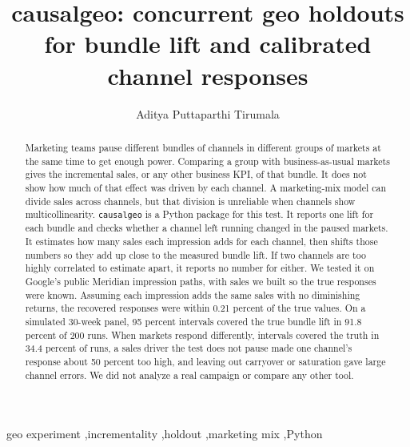 \documentclass[preprint,12pt]{elsarticle}
\begin{document}
\begin{frontmatter}

\title{causalgeo: concurrent geo holdouts for bundle lift and calibrated channel responses}

\author[aff1]{Aditya Puttaparthi Tirumala}
\address[aff1]{Independent Researcher, Tracy, CA, United States}

\begin{abstract}
Marketing teams pause different bundles of channels in different groups of markets at the same time to get enough power. Comparing a group with business-as-usual markets gives the incremental sales, or any other business KPI, of that bundle. It does not show how much of that effect was driven by each channel. A marketing-mix model can divide sales across channels, but that division is unreliable when channels show multicollinearity. \texttt{causalgeo} is a Python package for this test. It reports one lift for each bundle and checks whether a channel left running changed in the paused markets. It estimates how many sales each impression adds for each channel, then shifts those numbers so they add up close to the measured bundle lift. If two channels are too highly correlated to estimate apart, it reports no number for either. We tested it on Google's public Meridian impression paths, with sales we built so the true responses were known. Assuming each impression adds the same sales with no diminishing returns, the recovered responses were within 0.21 percent of the true values. On a simulated 30-week panel, 95 percent intervals covered the true bundle lift in 91.8 percent of 200 runs. When markets respond differently, intervals covered the truth in 34.4 percent of runs, a sales driver the test does not pause made one channel's response about 50 percent too high, and leaving out carryover or saturation gave large channel errors. We did not analyze a real campaign or compare any other tool.
\end{abstract}

\begin{keyword}
geo experiment \sep incrementality \sep holdout \sep marketing mix \sep Python
\end{keyword}

\end{frontmatter}
\end{document}
